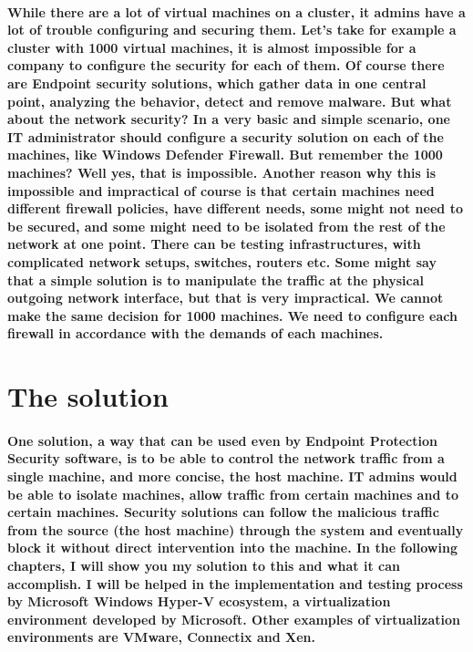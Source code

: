 \paragraph{While there are a lot of virtual machines on a cluster, it admins have a lot of trouble configuring and securing them. Let’s take for example a cluster with 1000 virtual 
machines, it is almost impossible for a company to configure the security for each of them. Of course there are Endpoint security solutions, which gather data in one central point, 
analyzing the behavior, detect and remove malware. But what about the network security? In a very basic and simple scenario, one IT administrator should configure a security solution 
on each of the machines, like Windows Defender Firewall. But remember the 1000 machines? Well yes, that is impossible. Another reason why this is impossible and impractical of course 
is that certain machines need different firewall policies, have different needs, some might not need to be secured, and some might need to be isolated from the rest of the network at 
one point. There can be testing infrastructures, with complicated network setups, switches, routers etc. Some might say that a simple solution is to manipulate the traffic at the 
physical outgoing network interface, but that is very impractical. We cannot make the same decision for 1000 machines. We need to configure each firewall in accordance with the demands 
of each machines. }

\section{The solution}

\paragraph{One solution, a way that can be used even by Endpoint Protection Security software, is to be able to control the network traffic from a single machine, and more concise, 
the host machine. IT admins would be able to isolate machines, allow traffic from certain machines and to certain machines. Security solutions can follow the malicious traffic from 
the source (the host machine) through the system and eventually block it without direct intervention into the machine. In the following chapters, I will show you my solution to this 
and what it can accomplish. I will be helped in the implementation and testing process by Microsoft Windows Hyper-V ecosystem, a virtualization environment developed by Microsoft. 
Other examples of virtualization environments are VMware, Connectix and Xen.}


